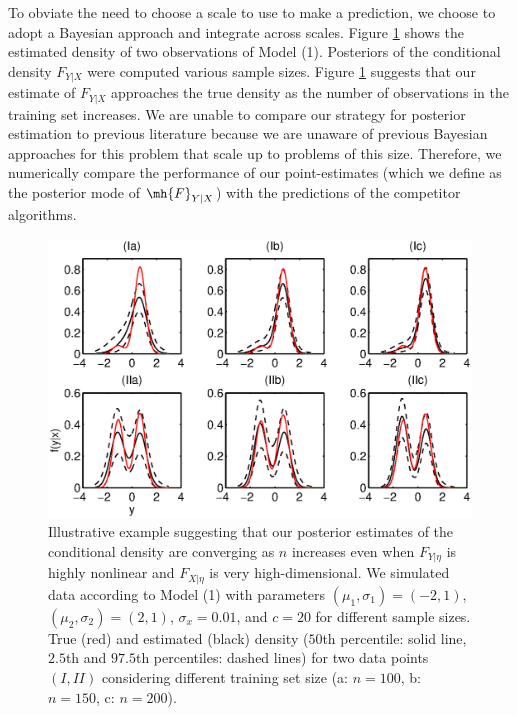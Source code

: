 To obviate the need to choose a scale to use to make a prediction, we choose to adopt a Bayesian approach and integrate across scales.  Figure \ref{plotDensity} shows the estimated density of two observations of Model (1).  Posteriors of the conditional density  $F_{Y|X}$  were computed various sample sizes. Figure \ref{plotDensity} suggests that our estimate of $F_{Y|X}$ approaches the true density as the number of observations in the training set increases. We are unable to compare our strategy for posterior estimation to previous literature because we are unaware of previous Bayesian approaches for this problem that scale up to problems of this size. Therefore, we numerically compare the performance of our point-estimates (which we define as the posterior mode of $\mh{F}_{Y|X}$) with the predictions of the competitor algorithms.

\begin{figure}[h!]
\centering
 \vskip -10pt 
\includegraphics[width=120mm]{../figs/ch3_density.eps}
 \vskip -15pt 
\caption{Illustrative example suggesting that our posterior estimates of the conditional density are converging as $n$ increases even when $F_{Y|\eta}$ is highly nonlinear and $F_{X|\eta}$ is very high-dimensional.  We simulated data according to Model (1) with parameters $(\mu_1,\sigma_1)=(-2,1)$, $(\mu_2,\sigma_2)=(2,1)$, $\sigma_x=0.01$, and $c=20$ for different sample sizes. True (red) and estimated (black) density ($50$th percentile: solid line, $2.5$th and $97.5$th percentiles: dashed lines) for two data points $(I, II)$ considering different training set size (a: $n=100$, b: $n=150$, c: $n=200$). } \label{plotDensity}
\end{figure}




